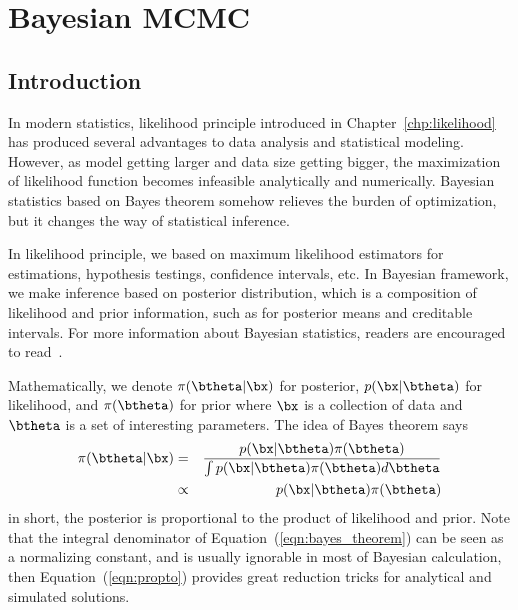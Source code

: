\chapter{Bayesian MCMC}
\label{chp:mcmc}



\section{Introduction}

In modern statistics, likelihood principle introduced in
Chapter~\ref{chp:likelihood} has produced several advantages to data analysis
and statistical modeling. However, as model getting larger and data size
getting bigger, the maximization of likelihood function becomes infeasible
analytically and numerically. Bayesian statistics based on Bayes theorem
somehow relieves the burden of optimization, but it changes the way of
statistical inference.

In likelihood principle, we based on maximum likelihood
estimators for estimations, hypothesis testings, confidence intervals, etc.
In Bayesian framework, we make inference based on posterior distribution,
which is a composition of likelihood and prior information,
such as for posterior means and creditable intervals.
For more information about Bayesian statistics, readers are encouraged to
read~\citet{Berger1993,Gelman2003}.

Mathematically, we denote $\pi(\btheta|\bx)$ for posterior, $p(\bx|\btheta)$
for likelihood, and $\pi(\btheta)$ for prior where $\bx$ is a collection of
data and $\btheta$ is a set of interesting parameters. The idea of Bayes
theorem says
\begin{eqnarray}
\pi(\btheta|\bx)
& = & \frac{p(\bx|\btheta) \pi(\btheta)}{\int p(\bx|\btheta) \pi(\btheta) d\btheta}
      \label{eqn:bayes_theorem} \\
& \propto & p(\bx|\btheta) \pi(\btheta)
            \label{eqn:propto}
\end{eqnarray}
in short, the posterior is proportional to the product of likelihood and prior.
Note that the integral denominator of Equation~(\ref{eqn:bayes_theorem}) can be
seen as a normalizing constant, and is usually ignorable in most of Bayesian
calculation, then Equation~(\ref{eqn:propto}) provides great reduction tricks
for analytical and simulated solutions. 

